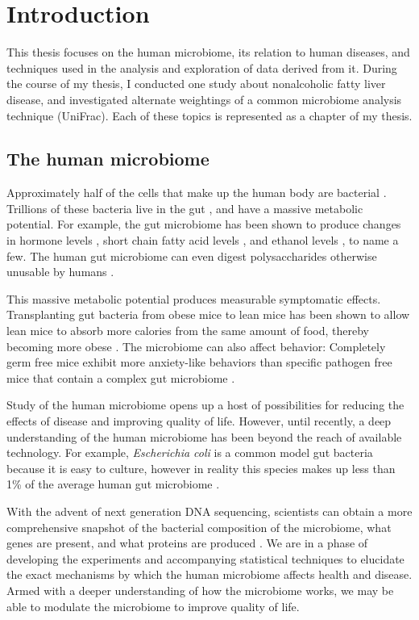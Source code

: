 \chapter{Introduction}
This thesis focuses on the human microbiome, its relation to human diseases, and techniques used in the analysis and exploration of data derived from it. During the course of my thesis, I conducted one study about nonalcoholic fatty liver disease, and investigated alternate weightings of a common microbiome analysis technique (UniFrac). Each of these topics is represented as a chapter of my thesis.

\section{The human microbiome}
Approximately half of the cells that make up the human body are bacterial \cite{sender2016revised}. Trillions of these bacteria live in the gut \cite{guarner2003gut}, and have a massive metabolic potential. For example, the gut microbiome has been shown to produce changes in hormone levels \cite{markle2013sex}, short chain fatty acid levels \cite{turnbaugh2008diet}, and ethanol levels \cite{krebs1970physiological}, to name a few. The human gut microbiome can even digest polysaccharides otherwise unusable by humans \cite{flint2008polysaccharide}.

This massive metabolic potential produces measurable symptomatic effects. Transplanting gut bacteria from obese mice to lean mice has been shown to allow lean mice to absorb more calories from the same amount of food, thereby becoming more obese \cite{turnbaugh2006obesity}. The microbiome can also affect behavior: Completely germ free mice exhibit more anxiety-like behaviors than specific pathogen free mice that contain a complex gut microbiome \cite{neufeld2011reduced}.

Study of the human microbiome opens up a host of possibilities for reducing the effects of disease and improving quality of life. However, until recently, a deep understanding of the human microbiome has been beyond the reach of available technology. For example, \textit{Escherichia coli} is a common model gut bacteria because it is easy to culture, however in reality this species makes up less than 1\% of the average human gut microbiome \cite{arumugam2011enterotypes}.

With the advent of next generation DNA sequencing, scientists can obtain a more comprehensive snapshot of the bacterial composition of the microbiome, what genes are present, and what proteins are produced \cite{di2013high}. We are in a phase of developing the experiments and accompanying statistical techniques to elucidate the exact mechanisms by which the human microbiome affects health and disease. Armed with a deeper understanding of how the microbiome works, we may be able to modulate the microbiome to improve quality of life.

